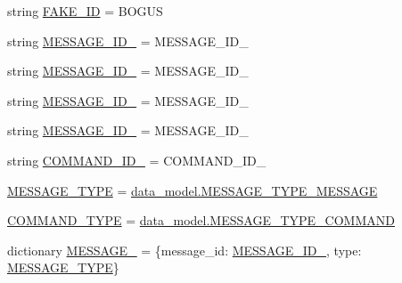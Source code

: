 \begin{DoxyCompactItemize}
string \hyperlink{namespaceparlai_1_1mturk_1_1core_1_1legacy__2018_1_1test_1_1test__socket__manager_adc8581c852a33707ff3648f1ed122fc7}{F\+A\+K\+E\+\_\+\+ID} = \textquotesingle{}B\+O\+G\+US\textquotesingle{}
\item 
string \hyperlink{namespaceparlai_1_1mturk_1_1core_1_1legacy__2018_1_1test_1_1test__socket__manager_a2c902168f165b607f4359c5b63738359}{M\+E\+S\+S\+A\+G\+E\+\_\+\+I\+D\+\_} = \textquotesingle{}M\+E\+S\+S\+A\+G\+E\+\_\+\+I\+D\+\_\textquotesingle{}
\item 
string \hyperlink{namespaceparlai_1_1mturk_1_1core_1_1legacy__2018_1_1test_1_1test__socket__manager_a51efc3179b72cfadb5632428518d1bb4}{M\+E\+S\+S\+A\+G\+E\+\_\+\+I\+D\+\_} = \textquotesingle{}M\+E\+S\+S\+A\+G\+E\+\_\+\+I\+D\+\_\textquotesingle{}
\item 
string \hyperlink{namespaceparlai_1_1mturk_1_1core_1_1legacy__2018_1_1test_1_1test__socket__manager_a2050e90565ebfc46176883652cc63269}{M\+E\+S\+S\+A\+G\+E\+\_\+\+I\+D\+\_} = \textquotesingle{}M\+E\+S\+S\+A\+G\+E\+\_\+\+I\+D\+\_\textquotesingle{}
\item 
string \hyperlink{namespaceparlai_1_1mturk_1_1core_1_1legacy__2018_1_1test_1_1test__socket__manager_aec587be0156bb2ea7b2c4915ab94cf1b}{M\+E\+S\+S\+A\+G\+E\+\_\+\+I\+D\+\_} = \textquotesingle{}M\+E\+S\+S\+A\+G\+E\+\_\+\+I\+D\+\_\textquotesingle{}
\item 
string \hyperlink{namespaceparlai_1_1mturk_1_1core_1_1legacy__2018_1_1test_1_1test__socket__manager_a91dc657327c496df3c93c4e869d9f02b}{C\+O\+M\+M\+A\+N\+D\+\_\+\+I\+D\+\_} = \textquotesingle{}C\+O\+M\+M\+A\+N\+D\+\_\+\+I\+D\+\_\textquotesingle{}
\item 
\hyperlink{namespaceparlai_1_1mturk_1_1core_1_1legacy__2018_1_1test_1_1test__socket__manager_a7468c1048cc6fa77c592002abbb9ffbb}{M\+E\+S\+S\+A\+G\+E\+\_\+\+T\+Y\+PE} = \hyperlink{namespaceparlai_1_1mturk_1_1core_1_1legacy__2018_1_1data__model_a888ff14bd7dc98e6266edf4f3cb725aa}{data\+\_\+model.\+M\+E\+S\+S\+A\+G\+E\+\_\+\+T\+Y\+P\+E\+\_\+\+M\+E\+S\+S\+A\+GE}
\item 
\hyperlink{namespaceparlai_1_1mturk_1_1core_1_1legacy__2018_1_1test_1_1test__socket__manager_aa68d69c90527bc61d50001b35464d8ef}{C\+O\+M\+M\+A\+N\+D\+\_\+\+T\+Y\+PE} = \hyperlink{namespaceparlai_1_1mturk_1_1core_1_1legacy__2018_1_1data__model_a6acb9cb225ff8fc95f1db5e7b30fcb2a}{data\+\_\+model.\+M\+E\+S\+S\+A\+G\+E\+\_\+\+T\+Y\+P\+E\+\_\+\+C\+O\+M\+M\+A\+ND}
\item 
dictionary \hyperlink{namespaceparlai_1_1mturk_1_1core_1_1legacy__2018_1_1test_1_1test__socket__manager_a218a90851d0f21576094b2a684959768}{M\+E\+S\+S\+A\+G\+E\+\_} = \{\textquotesingle{}message\+\_\+id\textquotesingle{}\+: \hyperlink{namespaceparlai_1_1mturk_1_1core_1_1legacy__2018_1_1test_1_1test__socket__manager_a2c902168f165b607f4359c5b63738359}{M\+E\+S\+S\+A\+G\+E\+\_\+\+I\+D\+\_}, \textquotesingle{}type\textquotesingle{}\+: \hyperlink{namespaceparlai_1_1mturk_1_1core_1_1legacy__2018_1_1test_1_1test__socket__manager_a7468c1048cc6fa77c592002abbb9ffbb}{M\+E\+S\+S\+A\+G\+E\+\_\+\+T\+Y\+PE}\}

\end{DoxyCompactItemize}
